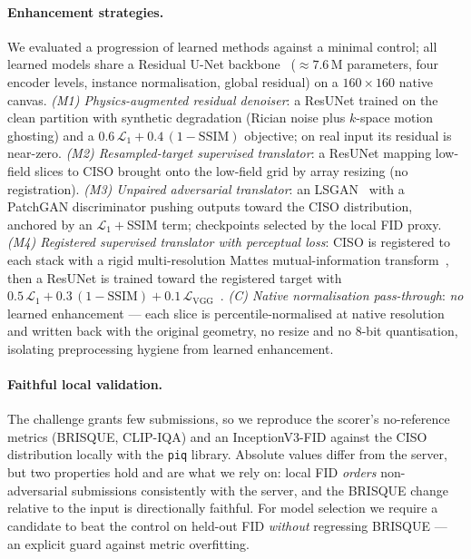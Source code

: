 \documentclass[runningheads]{llncs}
\begin{document}
\paragraph{Enhancement strategies.}
We evaluated a progression of learned methods against a minimal control; all
learned models share a Residual U-Net backbone~\cite{ronneberger2015unet}
($\approx7.6$\,M parameters, four encoder levels, instance normalisation, global
residual) on a $160\times160$ native canvas.
\emph{(M1) Physics-augmented residual denoiser}: a ResUNet trained on the clean
partition with synthetic degradation (Rician noise plus $k$-space motion
ghosting) and a $0.6\,\mathcal{L}_1+0.4\,(1-\mathrm{SSIM})$ objective; on real
input its residual is near-zero.
\emph{(M2) Resampled-target supervised translator}: a ResUNet mapping low-field
slices to CISO brought onto the low-field grid by array resizing (no
registration).
\emph{(M3) Unpaired adversarial translator}: an LSGAN~\cite{mao2017lsgan} with a
PatchGAN discriminator pushing outputs toward the CISO distribution, anchored by
an $\mathcal{L}_1{+}$SSIM term; checkpoints selected by the local FID proxy.
\emph{(M4) Registered supervised translator with perceptual loss}: CISO is
registered to each stack with a rigid multi-resolution Mattes mutual-information
transform~\cite{mattes2003}, then a ResUNet is trained toward the registered
target with $0.5\,\mathcal{L}_1+0.3\,(1-\mathrm{SSIM})+0.1\,\mathcal{L}_
\mathrm{VGG}$~\cite{johnson2016perceptual}.
\emph{(C) Native normalisation pass-through}: \emph{no} learned enhancement ---
each slice is percentile-normalised at native resolution and written back with
the original geometry, no resize and no 8-bit quantisation, isolating
preprocessing hygiene from learned enhancement.

\paragraph{Faithful local validation.}
The challenge grants few submissions, so we reproduce the scorer's no-reference
metrics (BRISQUE, CLIP-IQA) and an InceptionV3-FID against the CISO distribution
locally with the \texttt{piq} library. Absolute values differ from the server,
but two properties hold and are what we rely on: local FID \emph{orders}
non-adversarial submissions consistently with the server, and the BRISQUE change
relative to the input is directionally faithful. For model selection we require a
candidate to beat the control on held-out FID \emph{without} regressing
BRISQUE --- an explicit guard against metric overfitting.
\end{document}
